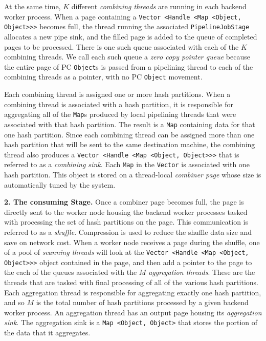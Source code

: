 At the same time, 
$K$ different \emph{combining threads} are running in each backend worker process.  
When a page containing a \texttt{Vector <Handle <Map <Object,
  Object}\texttt{>}\texttt{>}\texttt{>} becomes full, the thread running the associated
\texttt{PipelineJobStage} allocates a new pipe sink,
and the filled page is added to the queue of completed pages to be processed.  There is one such queue
associated with each of the $K$ combining threads.
We call each such queue a \emph{zero copy pointer queue} because the entire page of PC \texttt{Object}s is passed from a pipelining thread to each of the
combining threads as a pointer, with no PC \texttt{Object} movement.

Each combining thread is assigned one or more hash partitions.  When a combining thread
is associated with a hash partition, it is responsible for 
aggregating all of the \texttt{Map}s produced by local pipelining threads that were associated with that hash partition.
The result is a 
\texttt{Map} containing data for that one hash partition.  Since each combining
thread can be assigned more than one hash partition that will be sent to the same destination machine,
the combining thread also produces a \texttt{Vector <Handle <Map <Object, Object}\texttt{>}\texttt{>}\texttt{>} that is referred to as a \emph{combining sink}.
Each \texttt{Map} in the \texttt{Vector} is associated with one hash partition.
This object is stored on a thread-local \emph{combiner page} whose size is automatically tuned by the system.

\vspace{5pt}
{\bf 2. The consuming Stage.}
Once a combiner page becomes full, the page is directly sent to the worker node housing the
backend worker processes tasked with processing the set of hash partitions on the page.
This communication is referred to as a \emph{shuffle}.  
Compression is used to reduce the shuffle data size and save on network cost.
When a worker node receives a page during the shuffle, one of a pool of \emph{scanning threads} will look at the 
\texttt{Vector <Handle <Map <Object, Object}\texttt{>}\texttt{>}\texttt{>} object contained in the page, and then add a pointer to the page
to the each of the queues associated with the $M$ \emph{aggregation threads}.  These are the threads
that are tasked with final processing of all of the various hash partitions.
Each aggregation thread is responsible for aggregating exactly 
one hash partition, and so $M$ is the total number of hash partitions processed by a given backend worker process.
An aggregation thread has an output page housing its \emph{aggregation sink}.  The aggregation sink is a \texttt{Map <Object, Object>} that stores the portion of the
data that it aggregates.

